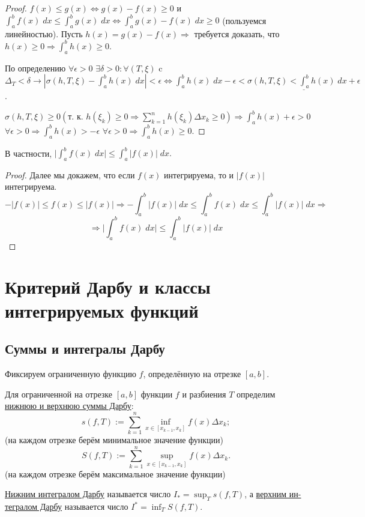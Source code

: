     \begin{proof}
    	$f(x) \leqslant g(x) \Leftrightarrow g(x) - f(x) \geqslant 0$ и $\int_a^b f(x) \; dx \leqslant \int_a^b g(x) \; dx \Leftrightarrow \int_a^b g(x) - f(x) \; dx \geqslant 0$ (пользуемся линейностью). Пусть $h(x) = g(x) - f(x) \Rightarrow$ требуется доказать, что $h(x) \geqslant 0 \Rightarrow \int_a^b h(x) \geqslant 0$.
    	
    	По определению $\forall \epsilon > 0$ $\exists \delta > 0 : \forall (T, \xi)$ c $\Delta_T < \delta \rightarrow  |\sigma(h, T, \xi) - \int_a^b h(x) \; dx| < \epsilon \Leftrightarrow \int_a^b h(x) \; dx - \epsilon < \underline{\sigma(h, T, \xi) < \int_a^b h(x) \; dx + \epsilon}$.
    	
    	$\sigma(h, T, \xi) \geqslant 0 (\text{т. к. } h(\xi_k) \geqslant 0 \Rightarrow \sum_{k = 1}^n h(\xi_k) \Delta x_k \geqslant 0) \Rightarrow \int_a^b h(x) + \epsilon > 0$ $\forall \epsilon > 0 \Rightarrow \int_a^b h(x) > -\epsilon$ $\forall \epsilon > 0 \Rightarrow \int_a^b h(x) \geqslant 0.$
    \end{proof}
    
    \begin{mention}
    	В частности, $\bigg|\displaystyle\int^b_a f(x) \; dx\bigg| \leqslant \displaystyle\int^b_a |f(x)| \; dx.$
    \end{mention}
    
    \begin{proof}
    	Далее мы докажем, что если $f(x)$ интегрируема, то и $|f(x)|$ интегрируема.
    	\[ -|f(x)| \leqslant f(x) \leqslant |f(x)|  \Rightarrow -\int_a^b |f(x)| \; dx \leqslant \int_a^b f(x) \; dx \leqslant \int_a^b |f(x)| \; dx \Rightarrow \]
    	\[ \Rightarrow \bigg| \int_a^b f(x) \; dx \bigg| \leqslant \int_a^b |f(x)| \; dx \]
    \end{proof}
    
    \chapter{Критерий Дарбу и классы интегрируемых функций}
    
    \section{Суммы и интегралы Дарбу}
    
    Фиксируем ограниченную функцию $f$, определённую на отрезке $[a, b]$.
    
    \begin{definition}
    	Для ограниченной на отрезке $[a, b]$ функции $f$ и разбиения $T$ определим \underline{нижнюю и верхнюю суммы Дарбу}:
    	\[s(f, T) := \sum^n_{k = 1}\inf_{x \in [x_{k - 1}, x_k]} f(x) \Delta x_k;\] (на каждом отрезке берём минимальное значение функции)
    	\[S(f, T) := \sum^n_{k = 1}\sup_{x \in [x_{k - 1}, x_k]} f(x) \Delta x_k.\] (на каждом отрезке берём максимальное значение функции)
    	
    	\underline{Нижним интегралом Дарбу} называется число $I_{*} = \displaystyle\sup_{T} s(f, T)$, а \underline{верхним ин-}
    	\underline{тегралом Дарбу} называется число $I^{*} = \displaystyle\inf_{T} S(f, T).$
    \end{definition}
    
